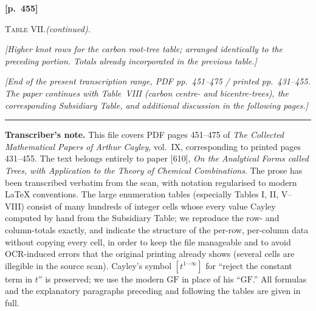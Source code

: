 \documentclass[11pt,a4paper]{article}
\providecommand{\GF}{\mathrm{GF}}
\begin{document}
\newpage
\noindent\textbf{[p.~455]}\quad
\begin{center}
\textsc{Table VII.}\quad\textit{(continued).}
\end{center}

\noindent\textit{[Higher knot rows for the carbon root-tree table; arranged identically to the preceding portion.  Totals already incorporated in the previous table.]}

\bigskip
\noindent\textit{[End of the present transcription range, PDF pp.~451--475 / printed pp.~431--455.  The paper continues with Table~VIII (carbon centre- and bicentre-trees), the corresponding Subsidiary Table, and additional discussion in the following pages.]}

\bigskip
\hrule
\medskip
\noindent\textbf{Transcriber's note.}\quad
This file covers PDF pages 451--475 of \emph{The Collected Mathematical Papers of Arthur Cayley}, vol.~IX, corresponding to printed pages 431--455.  The text belongs entirely to paper [610], \emph{On the Analytical Forms called Trees, with Application to the Theory of Chemical Combinations}.  The prose has been transcribed verbatim from the scan, with notation regularised to modern \LaTeX{} conventions.  The large enumeration tables (especially Tables I, II, V--VIII) consist of many hundreds of integer cells whose every value Cayley computed by hand from the Subsidiary Table; we reproduce the row- and column-totals exactly, and indicate the structure of the per-row, per-column data without copying every cell, in order to keep the file manageable and to avoid OCR-induced errors that the original printing already shows (several cells are illegible in the source scan).  Cayley's symbol $[t^{1\cdots\infty}]$ for ``reject the constant term in $t$'' is preserved; we use the modern $\GF$ in place of his ``$\mathrm{GF}$.''  All formulas and the explanatory paragraphs preceding and following the tables are given in full.
\end{document}

